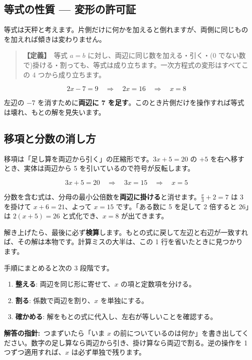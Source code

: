 \documentclass{article}
\begin{document}
\subsection{等式の性質 — 変形の許可証}

等式は天秤と考えます。片側だけに何かを加えると倒れますが、両側に同じものを加えれば傾きは変わりません。

\begin{quote}
\textbf{【定義】}\ 等式 \(a = b\) に対し、両辺に同じ数を加える・引く・(0 でない数で)掛ける・割っても、等式は成り立ちます。一次方程式の変形はすべてこの 4 つから成り立ちます。
\end{quote}

\[ 2x - 7 = 9 \quad \Rightarrow \quad 2x = 16 \quad \Rightarrow \quad x = 8 \]

左辺の \(-7\) を消すために\textbf{両辺に 7 を足す}。このとき片側だけを操作すれば等式は壊れ、もとの解を見失います。

\subsection{移項と分数の消し方}

移項は「足し算を両辺から引く」の圧縮形です。\(3x + 5 = 20\) の \(+5\) を右へ移すとき、実体は両辺から 5 を引いているので符号が反転します。

\[ 3x + 5 = 20 \quad \Rightarrow \quad 3x = 15 \quad \Rightarrow \quad x = 5 \]

分数を含む式は、分母の最小公倍数を\textbf{両辺に掛ける}と消せます。\(\frac{x}{3} + 2 = 7\) は 3 を掛けて \(x + 6 = 21\)、よって \(x = 15\) です。「ある数に 5 を足して 2 倍すると 26」は \(2(x + 5) = 26\) と式化でき、\(x = 8\) が出てきます。

解き上げたら、最後に必ず\textbf{検算}します。もとの式に戻して左辺と右辺が一致すれば、その解は本物です。計算ミスの大半は、この 1 行を省いたときに見つかります。

手順にまとめると次の 3 段階です。

\begin{enumerate}
\item \textbf{整える}: 両辺を同じ形に寄せて、\(x\) の項と定数項を分ける。
\item \textbf{割る}: 係数で両辺を割り、\(x\) を単独にする。
\item \textbf{確かめる}: 解をもとの式に代入し、左右が等しいことを確認する。
\end{enumerate}

\textbf{解答の指針:}\ つまずいたら「いま \(x\) の前についているのは何か」を書き出してください。数字の足し算なら両辺から引き、掛け算なら両辺で割る。逆の操作を 1 つずつ適用すれば、\(x\) は必ず単独で残ります。
\end{document}

